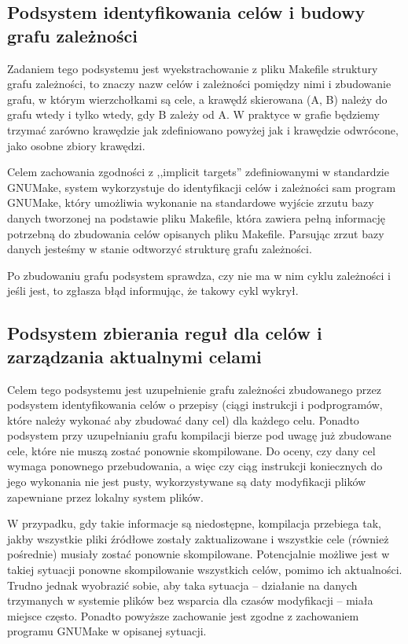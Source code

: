 \documentclass[a4paper]{article}
\begin{document}
\subsection{Podsystem identyfikowania celów i budowy grafu zależności}

Zadaniem tego podsystemu jest wyekstrachowanie z pliku Makefile struktury grafu zależności, to znaczy nazw celów i zależności pomiędzy nimi i zbudowanie grafu, w którym wierzchołkami są cele, a krawędź skierowana (A, B) należy do grafu wtedy i tylko wtedy, gdy B zależy od A.
W praktyce w grafie będziemy trzymać zarówno krawędzie jak zdefiniowano powyżej jak i krawędzie odwrócone, jako osobne zbiory krawędzi.

Celem zachowania zgodności z ,,implicit targets'' zdefiniowanymi w standardzie GNUMake, system wykorzystuje do identyfikacji celów i zależności sam program GNUMake, który umożliwia wykonanie na standardowe wyjście zrzutu bazy danych tworzonej na podstawie pliku Makefile, która zawiera pełną informację potrzebną do zbudowania celów opisanych pliku Makefile.
Parsując zrzut bazy danych jesteśmy w stanie odtworzyć strukturę grafu zależności.

Po zbudowaniu grafu podsystem sprawdza, czy nie ma w nim cyklu zależności i jeśli jest, to zgłasza błąd informując, że takowy cykl wykrył.

\subsection{Podsystem zbierania reguł dla celów i zarządzania aktualnymi celami}

Celem tego podsystemu jest uzupełnienie grafu zależności zbudowanego przez podsystem identyfikowania celów o przepisy (ciągi instrukcji i podprogramów, które należy wykonać aby zbudować dany cel) dla każdego celu.
Ponadto podsystem przy uzupełnianiu grafu kompilacji bierze pod uwagę już zbudowane cele, które nie muszą zostać ponownie skompilowane. Do oceny, czy dany cel wymaga ponownego przebudowania, a więc czy ciąg instrukcji koniecznych do jego wykonania nie jest pusty, wykorzystywane są daty modyfikacji plików zapewniane przez lokalny system plików.

W przypadku, gdy takie informacje są niedostępne, kompilacja przebiega tak, jakby wszystkie pliki źródłowe zostały zaktualizowane i wszystkie cele (również pośrednie) musiały zostać ponownie skompilowane.
Potencjalnie możliwe jest w takiej sytuacji ponowne skompilowanie wszystkich celów, pomimo ich aktualności.
Trudno jednak wyobrazić sobie, aby taka sytuacja -- działanie na danych trzymanych w systemie plików bez wsparcia dla czasów modyfikacji -- miała miejsce często.
Ponadto powyższe zachowanie jest zgodne z zachowaniem programu GNUMake w opisanej sytuacji.
\end{document}
